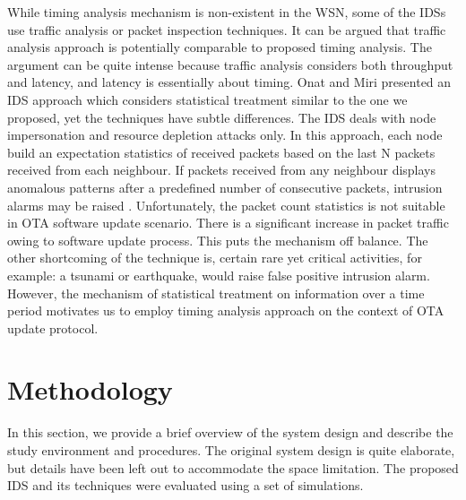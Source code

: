 \documentclass[conference]{IEEEtran}
\newcommand{\notedme}[1]{\raisebox{0pt}[0pt][0pt]{\pdfcomment[open=true,color=blue]{#1}}}
\begin{document}
While timing analysis mechanism is non-existent in the WSN, some of the IDSs use traffic analysis or packet inspection  techniques.
It can be argued that traffic analysis approach is potentially comparable to proposed timing analysis.
The argument can be quite intense because traffic analysis considers both throughput and latency, and latency is essentially about timing.
Onat and Miri presented an IDS approach which considers statistical treatment similar to the one we proposed, yet the techniques have subtle differences.
The IDS deals with node impersonation and resource depletion attacks only.
In this approach, each node build an expectation statistics of received packets based on the last N packets received from each neighbour.
If packets received from any neighbour displays anomalous patterns after a predefined number of consecutive packets, intrusion alarms may be raised \cite{1512911}.
Unfortunately, the  packet count statistics is not suitable in OTA software update scenario.
There is a significant increase in packet traffic owing to software update process. 
This puts the mechanism off balance.
The other shortcoming of the technique is, certain rare yet critical activities, for example: a tsunami or earthquake, would raise false positive intrusion alarm.
However, the mechanism of statistical treatment on information over a time period motivates us to employ timing analysis approach on the context of OTA update protocol.


\section{Methodology}
\label{sec:meth}
In this section, we provide a brief overview of the system design and describe the study environment and procedures.
The original system design is quite elaborate, but details have been left out to accommodate the space limitation.
The proposed IDS and its techniques were evaluated using a set of simulations. %
\end{document}

